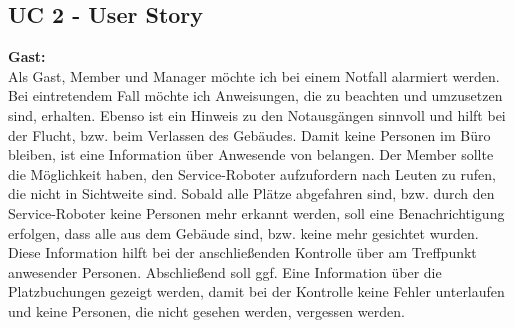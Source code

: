 \documentclass[
  ngerman           %
  ,twoside          %
  ,11pt
  ,pdftex
]{report}
\begin{document}
	

\subsection*{UC 2 - User Story}
\textbf{Gast:}
\\
    Als Gast, Member und Manager möchte ich bei einem Notfall alarmiert werden. Bei eintretendem Fall möchte ich 
    Anweisungen, die zu beachten und umzusetzen sind, erhalten. Ebenso ist ein Hinweis zu den Notausgängen 
    sinnvoll und hilft bei der Flucht, bzw. beim Verlassen des Gebäudes. Damit keine Personen im Büro 
    bleiben, ist eine Information über Anwesende von belangen. Der Member sollte die Möglichkeit haben, den 
    Service-Roboter aufzufordern nach Leuten zu rufen, die nicht in Sichtweite sind. Sobald alle Plätze 
    abgefahren sind, bzw. durch den Service-Roboter keine Personen mehr erkannt werden, soll eine Benachrichtigung 
    erfolgen, dass alle aus dem Gebäude sind, bzw. keine mehr gesichtet wurden. Diese Information hilft bei der 
    anschließenden Kontrolle über am Treffpunkt anwesender Personen. Abschließend soll ggf. Eine Information über die 
    Platzbuchungen gezeigt werden, damit bei der Kontrolle keine Fehler unterlaufen und keine Personen, die nicht 
    gesehen werden, vergessen werden.
\end{document}
